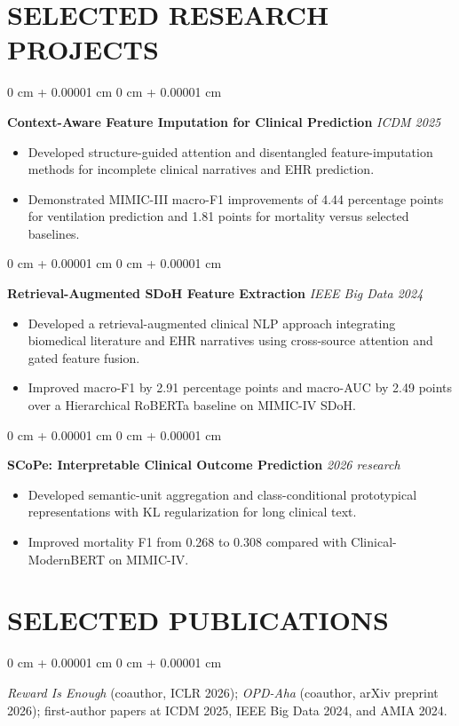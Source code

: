 \documentclass[10pt, letterpaper]{article}
\newenvironment{highlights}{
    \begin{itemize}[
        topsep=0.03 cm,
        parsep=0.02 cm,
        partopsep=0pt,
        itemsep=0pt,
        leftmargin=0 cm + 10pt
    ]
}{
    \end{itemize}
} %
\newenvironment{onecolentry}{
    \begin{adjustwidth}{
        0 cm + 0.00001 cm
    }{
        0 cm + 0.00001 cm
    }
}{
    \end{adjustwidth}
} %
\begin{document}
\section{SELECTED RESEARCH PROJECTS}
\begin{onecolentry}
\textbf{Context-Aware Feature Imputation for Clinical Prediction} \hfill \textit{ICDM 2025}
\begin{highlights}
\item Developed structure-guided attention and disentangled feature-imputation methods for incomplete clinical narratives and EHR prediction.
\item Demonstrated MIMIC-III macro-F1 improvements of 4.44 percentage points for ventilation prediction and 1.81 points for mortality versus selected baselines.
\end{highlights}
\end{onecolentry}
\vspace{0.02 cm}
\begin{onecolentry}
\textbf{Retrieval-Augmented SDoH Feature Extraction} \hfill \textit{IEEE Big Data 2024}
\begin{highlights}
\item Developed a retrieval-augmented clinical NLP approach integrating biomedical literature and EHR narratives using cross-source attention and gated feature fusion.
\item Improved macro-F1 by 2.91 percentage points and macro-AUC by 2.49 points over a Hierarchical RoBERTa baseline on MIMIC-IV SDoH.
\end{highlights}
\end{onecolentry}
\vspace{0.02 cm}
\begin{onecolentry}
\textbf{SCoPe: Interpretable Clinical Outcome Prediction} \hfill \textit{2026 research}
\begin{highlights}
\item Developed semantic-unit aggregation and class-conditional prototypical representations with KL regularization for long clinical text.
\item Improved mortality F1 from 0.268 to 0.308 compared with Clinical-ModernBERT on MIMIC-IV.
\end{highlights}
\end{onecolentry}
\vspace{0.02 cm}
\section{SELECTED PUBLICATIONS}
\begin{onecolentry}
\textit{Reward Is Enough} (coauthor, ICLR 2026); \textit{OPD-Aha} (coauthor, arXiv preprint 2026); first-author papers at ICDM 2025, IEEE Big Data 2024, and AMIA 2024.
\end{onecolentry}
\end{document}
